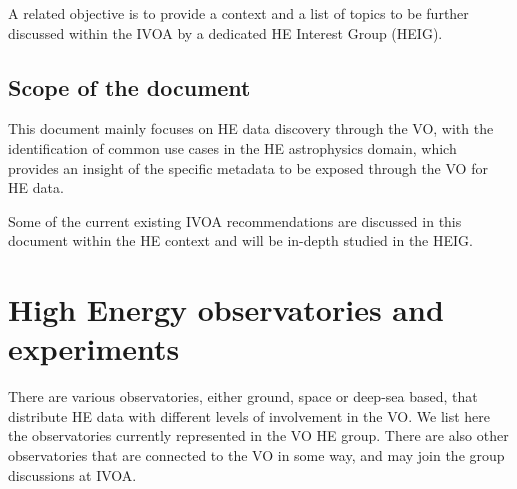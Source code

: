 \documentclass[11pt,a4paper]{ivoa}
\begin{document}
A related objective is to provide a context and a list of topics to be further discussed within the \gls{IVOA} by a dedicated \gls{HE} Interest Group (HEIG).


\subsection{Scope of the document}

This document mainly focuses on \gls{HE} data discovery through the \gls{VO}, with the identification of common use cases in the \gls{HE} astrophysics domain, which provides an insight of the specific metadata to be exposed through the \gls{VO} for \gls{HE} data.

Some of the current existing \gls{IVOA} recommendations are discussed in this document within the \gls{HE} context and will be in-depth
studied in the HEIG.









\section{High Energy observatories and experiments}
\label{sec:obs}

There are various observatories, either ground, space or deep-sea based, that distribute \gls{HE} data with
different levels of involvement in the \gls{VO}. We list here the observatories currently represented in the \gls{VO} \gls{HE} group.
There are also other observatories that are connected to the \gls{VO} in some way, and may join the group discussions at \gls{IVOA}.
\end{document}
